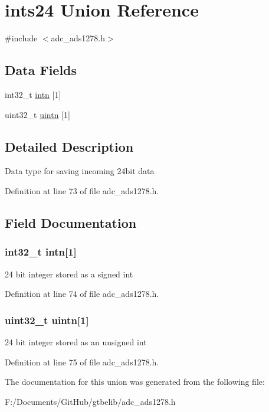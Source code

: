 \hypertarget{unionints24}{\section{ints24 Union Reference}
\label{unionints24}
}


{\ttfamily \#include $<$adc\+\_\+ads1278.\+h$>$}

\subsection*{Data Fields}
\begin{DoxyCompactItemize}
\item 
int32\+\_\+t \hyperlink{unionints24_a91fb87b32eacab4a65e1609def224766}{intn} \mbox{[}1\mbox{]}
\item 
uint32\+\_\+t \hyperlink{unionints24_ab862c6a1532031c260de0cd8d480dc83}{uintn} \mbox{[}1\mbox{]}
\end{DoxyCompactItemize}


\subsection{Detailed Description}
Data type for saving incoming 24bit data 

Definition at line 73 of file adc\+\_\+ads1278.\+h.



\subsection{Field Documentation}
\hypertarget{unionints24_a91fb87b32eacab4a65e1609def224766}{
\subsubsection[{intn}]{\setlength{\rightskip}{0pt plus 5cm}int32\+\_\+t intn\mbox{[}1\mbox{]}}}\label{unionints24_a91fb87b32eacab4a65e1609def224766}
24 bit integer stored as a signed int 

Definition at line 74 of file adc\+\_\+ads1278.\+h.

\hypertarget{unionints24_ab862c6a1532031c260de0cd8d480dc83}{
\subsubsection[{uintn}]{\setlength{\rightskip}{0pt plus 5cm}uint32\+\_\+t uintn\mbox{[}1\mbox{]}}}\label{unionints24_ab862c6a1532031c260de0cd8d480dc83}
24 bit integer stored as an unsigned int 

Definition at line 75 of file adc\+\_\+ads1278.\+h.



The documentation for this union was generated from the following file\+:\begin{DoxyCompactItemize}
\item 
F\+:/\+Documents/\+Git\+Hub/gtbelib/adc\+\_\+ads1278.\+h\end{DoxyCompactItemize}
